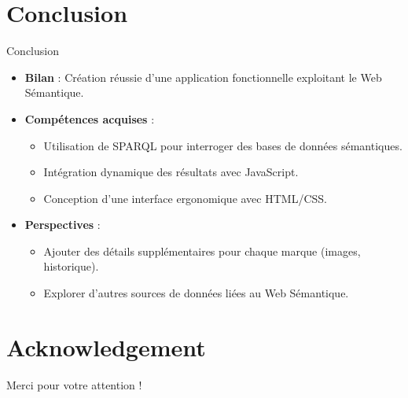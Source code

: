 \documentclass[10pt]{beamer}
\begin{document}
\section{Conclusion}
\begin{frame}{Conclusion}
\begin{itemize}
    \item \textbf{Bilan} : Création réussie d'une application fonctionnelle exploitant le Web Sémantique.  
    \item \textbf{Compétences acquises} :  
        \begin{itemize}
            \item Utilisation de SPARQL pour interroger des bases de données sémantiques.  
            \item Intégration dynamique des résultats avec JavaScript.  
            \item Conception d'une interface ergonomique avec HTML/CSS.  
        \end{itemize}
    \item \textbf{Perspectives} :  
        \begin{itemize}
            \item Ajouter des détails supplémentaires pour chaque marque (images, historique).  
            \item Explorer d'autres sources de données liées au Web Sémantique.  
        \end{itemize}
\end{itemize}
\end{frame}

\section*{Acknowledgement}
\begin{frame}
\textcolor{myNewColorA}{\Huge{\centerline{Merci pour votre attention !}}}
\end{frame}
\end{document}
